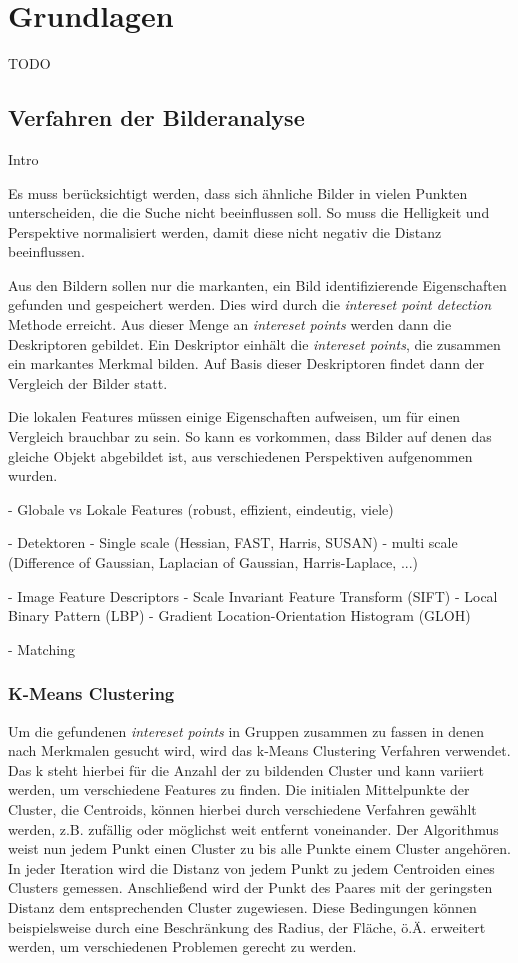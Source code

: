 \chapter{Grundlagen}

TODO

\section{Verfahren der Bilderanalyse}

Intro


Es muss berücksichtigt werden, dass sich ähnliche Bilder in vielen Punkten unterscheiden, die die Suche nicht beeinflussen soll. So muss die Helligkeit und Perspektive normalisiert werden, damit diese nicht negativ die Distanz beeinflussen. 

Aus den Bildern sollen nur die markanten, ein Bild identifizierende Eigenschaften gefunden und gespeichert werden. Dies wird durch die \textit{intereset point detection} Methode erreicht. Aus dieser Menge an \textit{intereset points} werden dann die Deskriptoren gebildet. Ein Deskriptor einhält die \textit{intereset points}, die zusammen ein markantes Merkmal bilden. Auf Basis dieser Deskriptoren findet dann der Vergleich der Bilder statt. 

Die lokalen Features müssen einige Eigenschaften aufweisen, um für einen Vergleich brauchbar zu sein. So kann es vorkommen, dass Bilder auf denen das gleiche Objekt abgebildet ist, aus verschiedenen Perspektiven aufgenommen wurden. 

- Globale vs Lokale Features (robust, effizient, eindeutig, viele)

- Detektoren 
	- Single scale (Hessian, FAST, Harris, SUSAN)
	- multi scale (Difference of Gaussian, Laplacian of Gaussian, Harris-Laplace, ...)
	
- Image Feature Descriptors 
	- Scale Invariant Feature Transform	(SIFT)
	- Local Binary Pattern (LBP)
	- Gradient Location-Orientation Histogram (GLOH)
	
- Matching

\subsection{K-Means Clustering}

Um die gefundenen \textit{intereset points} in Gruppen zusammen zu fassen in denen nach Merkmalen gesucht wird, wird das k-Means Clustering Verfahren verwendet. Das k steht hierbei für die Anzahl der zu bildenden Cluster und kann variiert werden, um verschiedene Features zu finden. Die initialen Mittelpunkte der Cluster, die Centroids, können hierbei durch verschiedene Verfahren gewählt werden,  z.B. zufällig oder möglichst weit entfernt voneinander. Der Algorithmus weist nun jedem Punkt einen Cluster zu bis alle Punkte einem Cluster angehören. In jeder Iteration wird die Distanz von jedem Punkt zu jedem Centroiden eines Clusters gemessen. Anschließend wird der Punkt des Paares mit der geringsten Distanz dem entsprechenden Cluster zugewiesen. Diese Bedingungen können beispielsweise durch eine Beschränkung des Radius, der Fläche, ö.Ä. erweitert werden, um verschiedenen Problemen gerecht zu werden.

